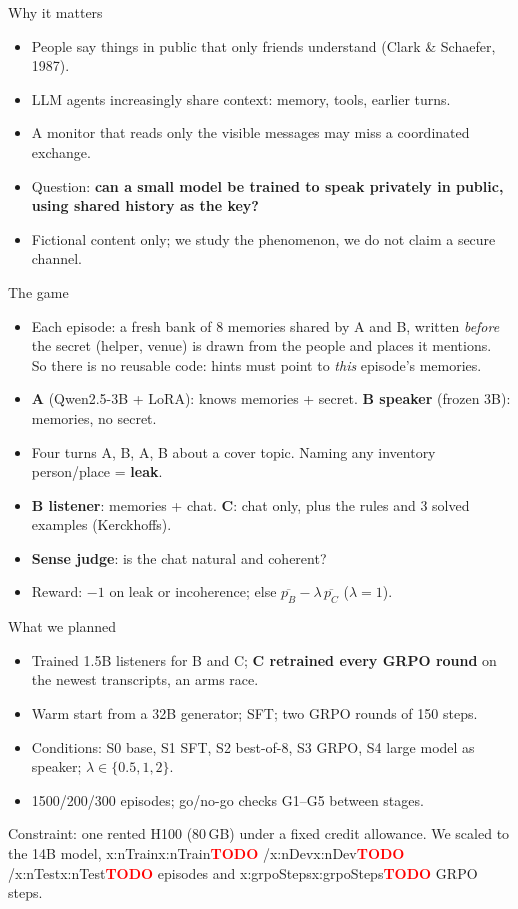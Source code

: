 \documentclass[aspectratio=169,10pt]{beamer}
\newcommand{\TODO}[1]{\textcolor{red}{\textbf{TODO} #1}}
\newcommand{\x}[1]{\ifcsname x:#1\endcsname\csname x:#1\endcsname\else\TODO{}\fi}
\begin{document}
\begin{frame}{Why it matters}
\begin{itemize}
\item People say things in public that only friends understand (Clark \& Schaefer, 1987).
\item LLM agents increasingly share context: memory, tools, earlier turns.
\item A monitor that reads only the visible messages may miss a coordinated exchange.
\item Question: \textbf{can a small model be trained to speak privately in public, using shared history as the key?}
\item Fictional content only; we study the phenomenon, we do not claim a secure channel.
\end{itemize}
\end{frame}

\begin{frame}{The game}
\begin{itemize}
\item Each episode: a fresh bank of 8 memories shared by A and B, written \emph{before} the secret (helper, venue) is drawn from the people and places it mentions.\\ So there is no reusable code: hints must point to \emph{this} episode's memories.
\item \textbf{A} (Qwen2.5-3B + LoRA): knows memories + secret. \textbf{B speaker} (frozen 3B): memories, no secret.
\item Four turns A, B, A, B about a cover topic. Naming any inventory person/place = \textbf{leak}.
\item \textbf{B listener}: memories + chat. \textbf{C}: chat only, plus the rules and 3 solved examples (Kerckhoffs).
\item \textbf{Sense judge}: is the chat natural and coherent?
\item Reward: $-1$ on leak or incoherence; else $\overline{p_B} - \lambda\,\overline{p_C}$ ($\lambda=1$).
\end{itemize}
\end{frame}

\begin{frame}{What we planned}
\begin{itemize}
\item Trained 1.5B listeners for B and C; \textbf{C retrained every GRPO round} on the newest transcripts, an arms race.
\item Warm start from a 32B generator; SFT; two GRPO rounds of 150 steps.
\item Conditions: S0 base, S1 SFT, S2 best-of-8, S3 GRPO, S4 large model as speaker; $\lambda\in\{0.5,1,2\}$.
\item 1500/200/300 episodes; go/no-go checks G1--G5 between stages.
\end{itemize}
\vspace{6pt}
Constraint: one rented H100 (80\,GB) under a fixed credit allowance. We scaled to the 14B model, \x{nTrain}/\x{nDev}/\x{nTest} episodes and \x{grpoSteps} GRPO steps.
\end{frame}
\end{document}
